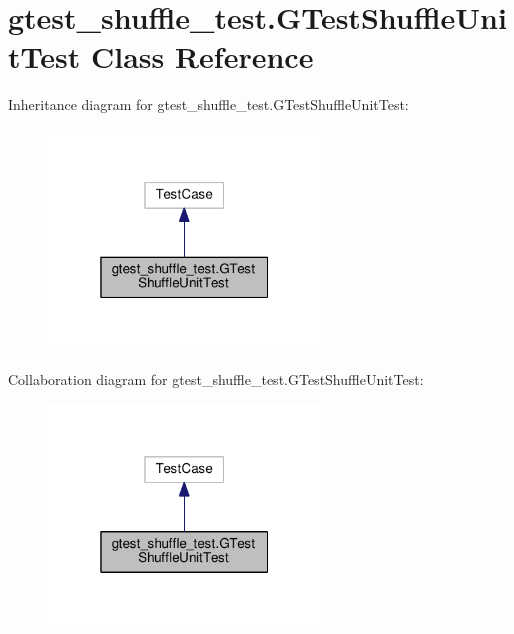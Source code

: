 \hypertarget{classgtest__shuffle__test_1_1GTestShuffleUnitTest}{}\section{gtest\+\_\+shuffle\+\_\+test.\+G\+Test\+Shuffle\+Unit\+Test Class Reference}
\label{classgtest__shuffle__test_1_1GTestShuffleUnitTest}


Inheritance diagram for gtest\+\_\+shuffle\+\_\+test.\+G\+Test\+Shuffle\+Unit\+Test\+:
\nopagebreak
\begin{figure}[H]
\begin{center}
\leavevmode
\includegraphics[width=205pt]{classgtest__shuffle__test_1_1GTestShuffleUnitTest__inherit__graph}
\end{center}
\end{figure}


Collaboration diagram for gtest\+\_\+shuffle\+\_\+test.\+G\+Test\+Shuffle\+Unit\+Test\+:
\nopagebreak
\begin{figure}[H]
\begin{center}
\leavevmode
\includegraphics[width=205pt]{classgtest__shuffle__test_1_1GTestShuffleUnitTest__coll__graph}
\end{center}
\end{figure}
